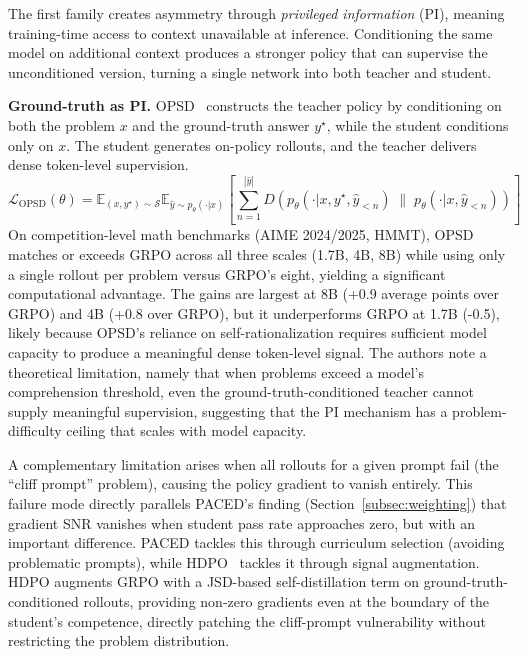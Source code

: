 \documentclass{article} %
\newcommand{\E}{\mathbb{E}}
\newcommand{\ptheta}{p_\theta}
\newcommand{\loss}{\mathcal{L}}
\begin{document}
The first family creates asymmetry through \emph{privileged information} (PI), meaning training-time access to context unavailable at inference. Conditioning the same model on additional context produces a stronger policy that can supervise the unconditioned version, turning a single network into both teacher and student.

\textbf{Ground-truth as PI.} OPSD~\citep{2601.18734} constructs the teacher policy by conditioning on both the problem $x$ and the ground-truth answer $y^\star$, while the student conditions only on $x$. The student generates on-policy rollouts, and the teacher delivers dense token-level supervision.
\begin{equation}
    \loss_{\text{OPSD}}(\theta) = \E_{(x, y^\star) \sim \mathcal{S}} \E_{\hat{y} \sim \ptheta(\cdot|x)} \left[ \sum_{n=1}^{|\hat{y}|} D\!\left( p_\theta(\cdot|x, y^\star, \hat{y}_{<n}) \;\|\; \ptheta(\cdot|x, \hat{y}_{<n}) \right) \right]
\end{equation}
On competition-level math benchmarks (AIME 2024/2025, HMMT), OPSD matches or exceeds GRPO across all three scales (1.7B, 4B, 8B) while using only a single rollout per problem versus GRPO's eight, yielding a significant computational advantage. The gains are largest at 8B (+0.9 average points over GRPO) and 4B (+0.8 over GRPO), but it underperforms GRPO at 1.7B (-0.5), likely because OPSD's reliance on self-rationalization requires sufficient model capacity to produce a meaningful dense token-level signal. The authors note a theoretical limitation, namely that when problems exceed a model's comprehension threshold, even the ground-truth-conditioned teacher cannot supply meaningful supervision, suggesting that the PI mechanism has a problem-difficulty ceiling that scales with model capacity.

A complementary limitation arises when all rollouts for a given prompt fail (the ``cliff prompt'' problem), causing the policy gradient to vanish entirely. This failure mode directly parallels PACED's finding (Section~\ref{subsec:weighting}) that gradient SNR vanishes when student pass rate approaches zero, but with an important difference. PACED tackles this through curriculum selection (avoiding problematic prompts), while HDPO~\citep{2603.23871} tackles it through signal augmentation. HDPO augments GRPO with a JSD-based self-distillation term on ground-truth-conditioned rollouts, providing non-zero gradients even at the boundary of the student's competence, directly patching the cliff-prompt vulnerability without restricting the problem distribution.
\end{document}
